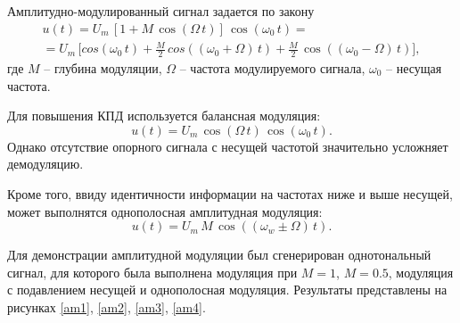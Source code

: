 \documentclass[a4paper,14pt]{extarticle}
\begin{document}
Амплитудно-модулированный сигнал задается по закону
\begin{multline*}
u(t) = U_m \, [1 + M \, \cos(\Omega\,t)] \, \cos(\omega_0\,t) = \\
 = U_m \, \big[ cos(\omega_0\,t) + \frac{M}{2}\,cos((\omega_0 + \Omega)\,t) + \frac{M}{2}\,\cos((\omega_0 -\Omega)\,t)\big],
\end{multline*}
где $M$ -- глубина модуляции, $\Omega$ -- частота модулируемого сигнала, $\omega_0$ -- несущая частота. 


Для повышения КПД используется балансная модуляция:
\begin{equation*}
u(t) = U_m \, \cos(\Omega\,t) \, \cos(\omega_0\,t).
\end{equation*}
Однако отсутствие опорного сигнала с несущей частотой значительно усложняет демодуляцию. 

Кроме того, ввиду идентичности информации на частотах ниже и выше несущей, может выполнятся однополосная амплитудная модуляция:
\begin{equation*}
u(t) = U_m \, M \, \cos((\omega_w \pm \Omega) \, t).
\end{equation*} 

Для демонстрации амплитудной модуляции был сгенерирован однотональный сигнал, для которого была выполнена модуляция при $M = 1$, $M = 0.5$, модуляция с подавлением несущей и однополосная модуляция. Результаты представлены на рисунках \ref{am1}, \ref{am2}, \ref{am3}, \ref{am4}.
\end{document}
